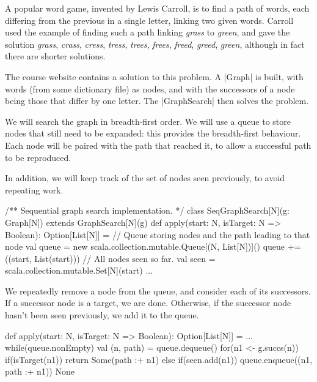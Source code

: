 \begin{slide}

\def\word#1{\emph{#1}}
A popular word game, invented by Lewis Carroll, is to find a path of words,
each differing from the previous in a single letter, linking two given words.
Carroll used the example of finding such a path linking \word{grass} to
\word{green}, and gave the solution \word{grass}, \word{crass}, \word{cress},
\word{tress}, \word{trees}, \word{frees}, \word{freed}, \word{greed},
\word{green}, although in fact there are shorter solutions.

The course website contains a solution to this problem.  A |Graph| is built,
with words (from some dictionary file) as nodes, and with the successors of a
node being those that differ by one letter.  The |GraphSearch| then solves the
problem.
\end{slide}


\begin{slide}

We will search the graph in breadth-first order.  We will use a queue to store
nodes that still need to be expanded: this provides the breadth-first
behaviour.  Each node will be paired with the path that reached it, to allow a
successful path to be reproduced.

In addition, we will keep track of the set of nodes seen previously, to avoid
repeating work.
\begin{scala}
/** Sequential graph search implementation. */
class SeqGraphSearch[N](g: Graph[N]) extends GraphSearch[N](g){
  def apply(start: N, isTarget: N => Boolean): Option[List[N]] = {
    // Queue storing nodes and the path leading to that node
    val queue = new scala.collection.mutable.Queue[(N, List[N])]()
    queue += ((start, List(start)))
    // All nodes seen so far.
    val seen = scala.collection.mutable.Set[N](start)
    ...
} }
\end{scala}
\end{slide}


\begin{slide}

We repeatedly remove a node from the queue, and consider each of its
successors.  If a successor node is a target, we are done.  Otherwise, if the
successor node hasn't been seen previously, we add it to the queue.
%
\begin{scala}
  def apply(start: N, isTarget: N => Boolean): Option[List[N]] = {
    ...
    while(queue.nonEmpty){
      val (n, path) = queue.dequeue()
      for(n1 <- g.succs(n)){
        if(isTarget(n1)) return Some(path :+ n1)
        else if(seen.add(n1)) queue.enqueue((n1, path :+ n1))
      }
    }
    None
  }
\end{scala}
\end{slide}

